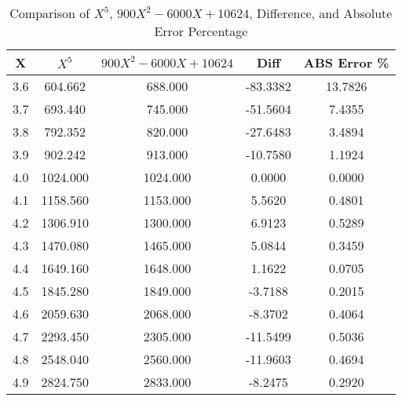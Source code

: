 ﻿%
\begin{table}[h!]
    \centering
    \caption{Comparison of $X^5$, $900X^2 - 6000X + 10624$, Difference, and Absolute Error Percentage}
    \begin{tabular}{|c|c|c|c|c|}
        \hline
        \textbf{X} & \textbf{$X^5$} & \textbf{$900X^2 - 6000X + 10624$} & \textbf{Diff} & \textbf{ABS Error \%} \\ \hline
        3.6        & 604.662        & 688.000                           & -83.3382      & 13.7826               \\ \hline
        3.7        & 693.440        & 745.000                           & -51.5604      & 7.4355                \\ \hline
        3.8        & 792.352        & 820.000                           & -27.6483      & 3.4894                \\ \hline
        3.9        & 902.242        & 913.000                           & -10.7580      & 1.1924                \\ \hline
        4.0        & 1024.000       & 1024.000                          & 0.0000        & 0.0000                \\ \hline
        4.1        & 1158.560       & 1153.000                          & 5.5620        & 0.4801                \\ \hline
        4.2        & 1306.910       & 1300.000                          & 6.9123        & 0.5289                \\ \hline
        4.3        & 1470.080       & 1465.000                          & 5.0844        & 0.3459                \\ \hline
        4.4        & 1649.160       & 1648.000                          & 1.1622        & 0.0705                \\ \hline
        4.5        & 1845.280       & 1849.000                          & -3.7188       & 0.2015                \\ \hline
        4.6        & 2059.630       & 2068.000                          & -8.3702       & 0.4064                \\ \hline
        4.7        & 2293.450       & 2305.000                          & -11.5499      & 0.5036                \\ \hline
        4.8        & 2548.040       & 2560.000                          & -11.9603      & 0.4694                \\ \hline
        4.9        & 2824.750       & 2833.000                          & -8.2475       & 0.2920                \\ \hline

\end{tabular}
\end{table}
